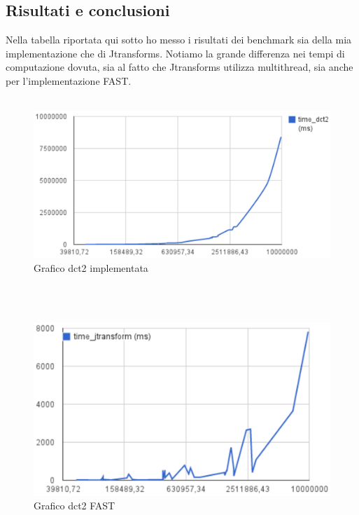 \documentclass[12pt]{article}
\begin{document}


\subsection{Risultati e conclusioni}
Nella tabella riportata qui sotto ho messo i risultati dei benchmark sia della mia implementazione che di Jtransforms.
Notiamo la grande differenza nei tempi di computazione dovuta, sia al fatto che Jtransforms utilizza multithread, sia anche per l'implementazione FAST.
\\\\
\begin{figure}[htbp]
\centering
\includegraphics{grafico_dct2.eps}
\caption{Grafico dct2 implementata}
\end{figure}
\\\\
\begin{figure}[htbp]
\centering
\includegraphics{grafico_jtransform.eps}
\caption{Grafico dct2 FAST}
\end{figure}
\\\\
\end{document}
